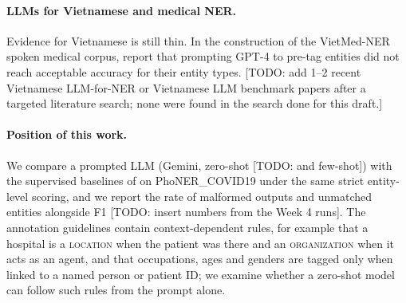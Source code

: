 \paragraph{LLMs for Vietnamese and medical NER.}
Evidence for Vietnamese is still thin.
In the construction of the VietMed-NER spoken medical corpus, \citet{vietmed2024} report that
prompting GPT-4 to pre-tag entities did not reach acceptable accuracy for their entity types.
[TODO: add 1--2 recent Vietnamese LLM-for-NER or Vietnamese LLM benchmark papers after a
targeted literature search; none were found in the search done for this draft.]

\paragraph{Position of this work.}
We compare a prompted LLM (Gemini, zero-shot [TODO: and few-shot]) with the supervised
baselines of \citet{truong2021covid} on PhoNER\_COVID19 under the same strict
entity-level scoring, and we report the rate of malformed outputs and unmatched entities
alongside F1 [TODO: insert numbers from the Week 4 runs].
The annotation guidelines contain context-dependent rules, for example that a hospital is a
\textsc{location} when the patient was there and an \textsc{organization} when it acts as an agent,
and that occupations, ages and genders are tagged only when linked to a named person or patient ID;
we examine whether a zero-shot model can follow such rules from the prompt alone.
